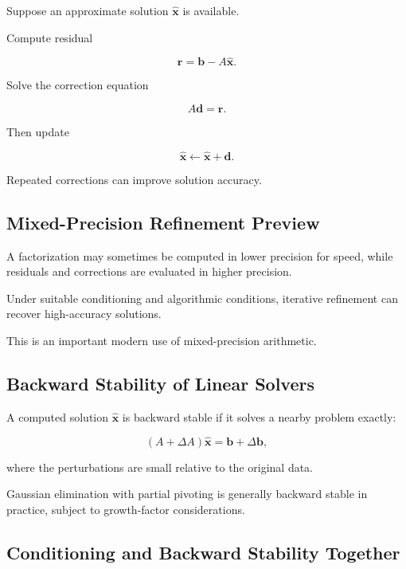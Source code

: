 Suppose an approximate solution \(\widehat{\mathbf{x}}\) is available.

Compute residual

\[
\boxed{
\mathbf{r}
=
\mathbf{b}
-
A\widehat{\mathbf{x}}.
}
\]

Solve the correction equation

\[
\boxed{
A\mathbf{d}
=
\mathbf{r}.
}
\]

Then update

\[
\boxed{
\widehat{\mathbf{x}}
\leftarrow
\widehat{\mathbf{x}}
+
\mathbf{d}.
}
\]

Repeated corrections can improve solution accuracy.

\subsection{Mixed-Precision Refinement Preview}
\label{subsec:mixed-precision-refinement}

A factorization may sometimes be computed in lower precision for speed,
while residuals and corrections are evaluated in higher precision.

Under suitable conditioning and algorithmic conditions, iterative
refinement can recover high-accuracy solutions.

This is an important modern use of mixed-precision arithmetic.

\subsection{Backward Stability of Linear Solvers}
\label{subsec:backward-stability-linear-solvers}

A computed solution \(\widehat{\mathbf{x}}\) is backward stable if it
solves a nearby problem exactly:

\[
\boxed{
(A+\Delta A)
\widehat{\mathbf{x}}
=
\mathbf{b}+\Delta\mathbf{b},
}
\]

where the perturbations are small relative to the original data.

Gaussian elimination with partial pivoting is generally backward stable in
practice, subject to growth-factor considerations.

\subsection{Conditioning and Backward Stability Together}
\label{subsec:conditioning-backward-stability}

